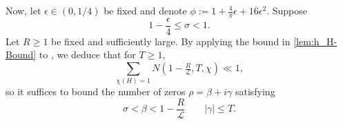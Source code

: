 \documentclass[12pt,psamsfonts]{amsart}
\theoremstyle{definition}
\theoremstyle{remark}
\numberwithin{equation}{section}
\theoremstyle{plain}
\theoremstyle{remark}
\renewcommand{\1}{ {\bf 1}}
\newcommand{\cL}{\mathcal{L}}
\begin{document}
Now, let $\epsilon \in (0,1/4)$ be fixed and denote $\phi := 1 + \tfrac{4}{\pi} \epsilon + 16\epsilon^2$. Suppose
\begin{equation}
\label{eqn:SigmaCondition}
1- \frac{\epsilon}{4} \leq \sigma < 1. 
\end{equation}
Let $R \geq 1$ be fixed and sufficiently large. By applying the bound in \cref{lem:h_H-Bound} to \cite[Theorem 4.3]{Weiss}, we deduce that for $T \geq 1$,
\begin{equation}
\sum_{\chi(H)=1} N(1-\tfrac{R}{\cL}, T,\chi) \ll 1,
\label{eqn:ThinStrip}
\end{equation}
so it suffices to bound the number of zeros $\rho = \beta+i\gamma$ satisfying
\begin{equation}
\sigma < \beta < 1 - \frac{R}{\cL} \qquad |\gamma| \leq T.
\label{eqn:ZeroRegion}
\end{equation}
\end{document}
